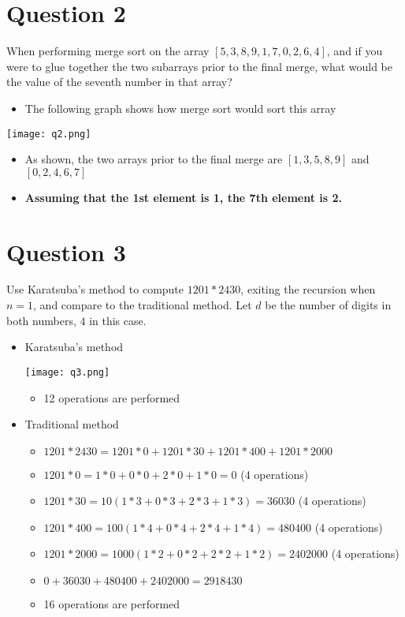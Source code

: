 \documentclass{article}
\begin{document}
    \pagebreak
    \section{Question 2}
    When performing merge sort on the array $[5, 3, 8, 9, 1, 7, 0, 2, 6, 4]$, and if you were to glue together the two subarrays
    prior to the final merge, what would be the value of the seventh number in that array?
    	\begin{itemize}
    		\item The following graph shows how merge sort would sort this array
    	\end{itemize}
    	\begin{center}
    		\texttt{[image: q2.png]}
    	\end{center}
    	\begin{itemize}
    		\item As shown, the two arrays prior to the final merge are $[1, 3, 5, 8, 9]$ and $[0, 2, 4, 6, 7]$
    		\item \textbf{Assuming that the 1st element is 1, the 7th element is 2.} 
    	\end{itemize}
    
   \pagebreak
   \section{Question 3}
   Use Karatsuba's method to compute $1201 * 2430$, exiting the recursion when $n = 1$, and compare to the traditional method.
   Let $d$ be the number of digits in both numbers, $4$ in this case. 
   	\begin{itemize}
   		\item Karatsuba's method
   			\begin{center}
   				\texttt{[image: q3.png]}
   			\end{center}
   			\begin{itemize}
   				\item 12 operations are performed
   			\end{itemize}
   		\item Traditional method
   			\begin{itemize}
   				\item $1201 * 2430 = 1201 * 0 + 1201 * 30 + 1201 * 400 + 1201 * 2000$
   				\item $1201 * 0 = 1*0 + 0*0 + 2*0 + 1*0 = 0$ (4 operations)
   				\item $1201 * 30 = 10(1*3 + 0*3 + 2*3 + 1*3) = 36030$ (4 operations)
   				\item $1201 * 400 = 100(1*4 + 0*4 + 2*4 + 1*4) = 480400$ (4 operations)
   				\item $1201 * 2000 = 1000(1*2 + 0*2 + 2*2 + 1*2) = 2402000$ (4 operations)
   				\item $0 + 36030 + 480400 + 2402000 = 2918430$
   				\item 16 operations are performed
   			\end{itemize}
  	\end{itemize}
    	
    	
\end{document}
